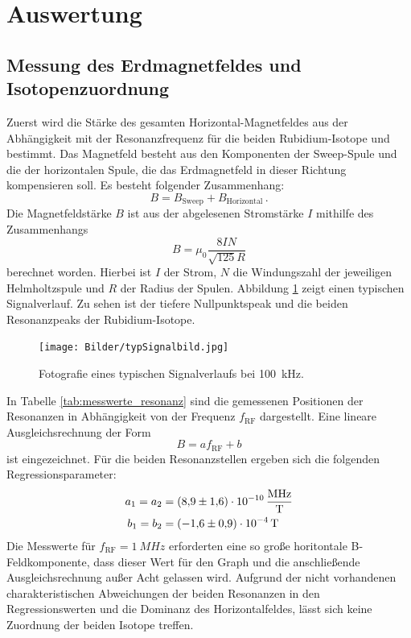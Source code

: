 \section{Auswertung}
\subsection{Messung des Erdmagnetfeldes und Isotopenzuordnung}
Zuerst wird die Stärke des gesamten Horizontal-Magnetfeldes aus der Abhängigkeit mit der Resonanzfrequenz für die beiden Rubidium-Isotope  und  bestimmt.
Das Magnetfeld besteht aus den Komponenten der Sweep-Spule und die der horizontalen Spule, die das Erdmagnetfeld in dieser Richtung kompensieren soll. Es besteht folgender Zusammenhang:
\begin{equation}
  B=B_\text{Sweep}+B_\text{Horizontal}\,.
\end{equation}
Die Magnetfeldstärke $B$ ist aus der abgelesenen Stromstärke $I$ mithilfe des Zusammenhangs
\begin{equation}
B=\mu_0\frac{8IN}{\sqrt{125}R}
\end{equation}
berechnet worden. Hierbei ist $I$ der Strom, $N$ die Windungszahl der jeweiligen Helmholtzspule und $R$ der Radius der Spulen.
Abbildung \ref{fig:typSignalbild} zeigt einen typischen Signalverlauf. Zu sehen ist der tiefere Nullpunktspeak und die beiden Resonanzpeaks der Rubidium-Isotope.
\begin{figure}[H]
  \centering
  \texttt{[image: Bilder/typSignalbild.jpg]}
  \caption{Fotografie eines typischen Signalverlaufs bei \SI{100}{kHz}.}
  \label{fig:typSignalbild}
\end{figure}
In Tabelle \ref{tab:messwerte_resonanz} sind die gemessenen Positionen der Resonanzen in Abhängigkeit von der Frequenz $f_\text{RF}$ dargestellt. Eine lineare Ausgleichsrechnung der Form
\begin{equation}
  B=af_\text{RF}+b
\end{equation}
ist eingezeichnet.
Für die beiden Resonanzstellen ergeben sich die folgenden Regressionsparameter:
\begin{align*}
  a_1 = a_2 &= \SI{8,9 \pm 1,6 e-10}{\frac{MHz}{T}} \\
  b_1 = b_2 &= \SI{-1,6 \pm 0,9 e-4}{T}\\
\end{align*}
Die Messwerte für $f_\text{RF}=\SI{1}{MHz}$ erforderten eine so große horitontale B-Feldkomponente, dass dieser Wert für den Graph und die anschließende Ausgleichsrechnung außer Acht gelassen wird. Aufgrund der nicht vorhandenen charakteristischen Abweichungen der beiden Resonanzen in den Regressionswerten und die Dominanz des Horizontalfeldes, lässt sich keine Zuordnung der beiden Isotope treffen.
